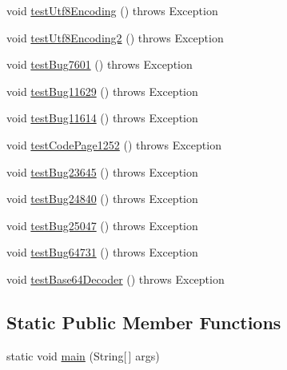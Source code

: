 \begin{DoxyCompactItemize}
void \mbox{\hyperlink{classtestsuite_1_1regression_1_1_string_regression_test_a4f3f125a39d60c4abe46d69db6002ede}{test\+Utf8\+Encoding}} ()  throws Exception 
\item 
void \mbox{\hyperlink{classtestsuite_1_1regression_1_1_string_regression_test_a7029c28b203cd6e7cb1b64d78f8d1c26}{test\+Utf8\+Encoding2}} ()  throws Exception 
\item 
void \mbox{\hyperlink{classtestsuite_1_1regression_1_1_string_regression_test_a7daa6aace5462393758a0ccdcb6dd4c9}{test\+Bug7601}} ()  throws Exception 
\item 
void \mbox{\hyperlink{classtestsuite_1_1regression_1_1_string_regression_test_a9c6c23e956d2ffe160c366e399016309}{test\+Bug11629}} ()  throws Exception 
\item 
void \mbox{\hyperlink{classtestsuite_1_1regression_1_1_string_regression_test_a06cd6f2ea6096ebef7516e5ed1ff3659}{test\+Bug11614}} ()  throws Exception 
\item 
void \mbox{\hyperlink{classtestsuite_1_1regression_1_1_string_regression_test_a4d94b374bdd0e09b4ecc7e541d5780ac}{test\+Code\+Page1252}} ()  throws Exception 
\item 
void \mbox{\hyperlink{classtestsuite_1_1regression_1_1_string_regression_test_a0b910fb41d304e6b938f8908dfffe0bf}{test\+Bug23645}} ()  throws Exception 
\item 
void \mbox{\hyperlink{classtestsuite_1_1regression_1_1_string_regression_test_a64fc08a013f1e23f5fcaaeecb3681aa5}{test\+Bug24840}} ()  throws Exception 
\item 
void \mbox{\hyperlink{classtestsuite_1_1regression_1_1_string_regression_test_a310d7878e44bc9bf13daa040be2bb847}{test\+Bug25047}} ()  throws Exception 
\item 
void \mbox{\hyperlink{classtestsuite_1_1regression_1_1_string_regression_test_a7e24a2a41964d76d3b5b82b5a064d820}{test\+Bug64731}} ()  throws Exception 
\item 
void \mbox{\hyperlink{classtestsuite_1_1regression_1_1_string_regression_test_afb5ff96468558e939f5ae2548d75c06f}{test\+Base64\+Decoder}} ()  throws Exception 
\end{DoxyCompactItemize}
\subsection*{Static Public Member Functions}
\begin{DoxyCompactItemize}
\item 
static void \mbox{\hyperlink{classtestsuite_1_1regression_1_1_string_regression_test_ab7f0eee5f91473ea32fec25015ad945d}{main}} (String\mbox{[}$\,$\mbox{]} args)
\end{DoxyCompactItemize}
